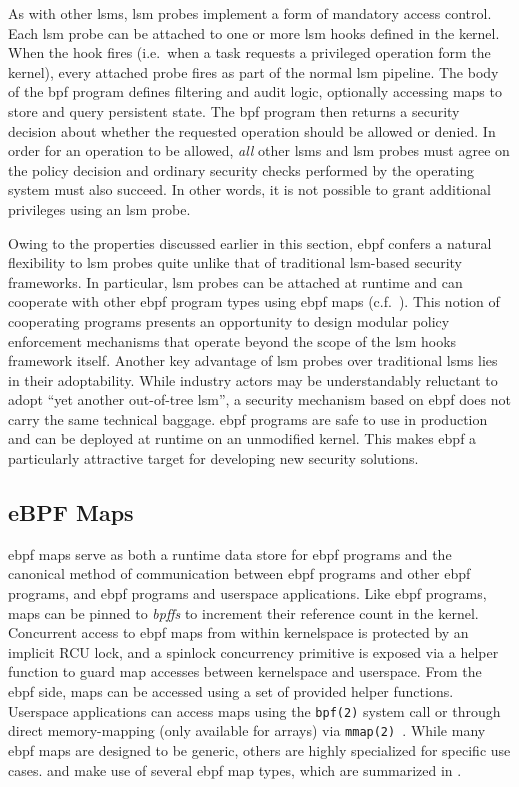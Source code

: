 As with other \gls{lsm}s, \gls{lsm} probes implement a form of mandatory access control.
Each \gls{lsm} probe can be attached to one or more \gls{lsm} hooks defined in the kernel.
When the hook fires (i.e.~when a task requests a privileged operation form the kernel),
every attached probe fires as part of the normal \gls{lsm} pipeline. The body of the
\gls{bpf} program defines filtering and audit logic, optionally accessing maps to store
and query persistent state. The \gls{bpf} program then returns a security decision about
whether the requested operation should be allowed or denied.  In order for an operation to
be allowed, \textit{all} other \gls{lsm}s and \gls{lsm} probes must agree on the policy
decision and ordinary security checks performed by the operating system must also succeed.
In other words, it is not possible to grant additional privileges using an \gls{lsm}
probe.

Owing to the properties discussed earlier in this section, \gls{ebpf} confers a natural
flexibility to \gls{lsm} probes quite unlike that of traditional \gls{lsm}-based security
frameworks.  In particular, \gls{lsm} probes can be attached at runtime and can cooperate
with other \gls{ebpf} program types using \gls{ebpf} maps (c.f.~).
This notion of cooperating programs presents an opportunity to design modular policy
enforcement mechanisms that operate beyond the scope of the \gls{lsm} hooks framework
itself.  Another key advantage of \gls{lsm} probes over traditional \gls{lsm}s lies in
their adoptability.  While industry actors may be understandably reluctant to adopt
\enquote{yet another out-of-tree \gls{lsm}}, a security mechanism based on \gls{ebpf} does
not carry the same technical baggage.  \gls{ebpf} programs are safe to use in production
and can be deployed at runtime on an unmodified kernel.  This makes \gls{ebpf}
a particularly attractive target for developing new security solutions.

\subsection{eBPF Maps}%
\label{ss:bpf-maps-bg}

\gls{ebpf} maps serve as both a runtime data store for \gls{ebpf} programs and the
canonical method of communication between \gls{ebpf} programs and other \gls{ebpf}
programs, and \gls{ebpf} programs and userspace applications. Like \gls{ebpf} programs,
maps can be pinned to \textit{bpffs}  to increment their reference count in the kernel.
Concurrent access to \gls{ebpf} maps from within kernelspace is protected by an implicit
RCU lock, and a spinlock concurrency primitive is exposed via a helper function to guard
map accesses between kernelspace and userspace.  From the \gls{ebpf} side, maps can be
accessed using a set of provided helper functions.  Userspace applications can access maps
using the \texttt{bpf(2)} system call or through direct memory-mapping (only available for
arrays) via \texttt{mmap(2)~\cite{gregg2019_bpf}}. While many \gls{ebpf} maps are designed
to be generic, others are highly specialized for specific use cases. \bpfcontain{} and
\bpfbox{} make use of several \gls{ebpf} map types, which are summarized in
.

